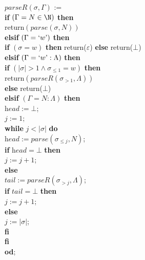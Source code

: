 \documentclass[adraft]{eptcs}
\begin{document}
\noindent
\begin{minipage}{3in}
$\textit{parseR}(\sigma,\Gamma)$ :=\\ \mbox{}
\quad \textbf{if} $(\Gamma=N\in\N)$ \textbf{then} \\ \mbox{}
\quad \quad return$(\textit{parse}(\sigma,N))$ \\ \mbox{}
\quad \textbf{elsif} $(\Gamma=`w\mbox{'})$ \textbf{then} \\ \mbox{}
\quad \quad \textbf{if} $(\sigma = w)$ \textbf{then} return($\varepsilon$) \textbf{else} return($\bot$) \\ \mbox{}
\quad \textbf{elsif} $(\Gamma= `w\mbox{'} : \Lambda)$ \textbf{then} \\ \mbox{}
\quad \quad \textbf{if} $(|\sigma| > 1 \wedge \sigma_{\leq 1} = w)$ \textbf{then} \\ \mbox{}
\quad \quad \quad return$(\textit{parseR}(\sigma_{> 1},\Lambda))$ \\ \mbox{}
\quad \quad \textbf{else} return($\bot$) \\ \mbox{}
\quad \textbf{elsif} $(\Gamma= N : \Lambda)$ \textbf{then} \\ \mbox{}
\quad \quad  $\textit{head} := \bot$; \\ \mbox{}
\quad \quad  $j:=1$; \\ \mbox{}
\quad \quad  \textbf{while} $j < |\sigma|$ \textbf{do} \\ \mbox{}
\quad \quad \quad $\textit{head} := \textit{parse}(\sigma_{\leq j},N)$; \\ \mbox{}
\quad \quad \quad  \textbf{if} $\textit{head}=\bot$ \textbf{then} \\ \mbox{}
\quad \quad \quad \quad $j:=j+1$; \\ \mbox{}
\quad \quad \quad  \textbf{else}  \\ \mbox{}
\quad \quad \quad \quad $\textit{tail} := \textit{parseR}(\sigma_{> j},\Lambda)$; \\ \mbox{}
\quad \quad \quad \quad  \textbf{if} $\textit{tail}=\bot$ \textbf{then} \\ \mbox{}
\quad \quad \quad \quad \quad $j:=j+1$; \\ \mbox{}
\quad \quad \quad \quad  \textbf{else}  \\ \mbox{}
\quad \quad \quad \quad \quad $j:=|\sigma|$; \\ \mbox{}
\quad \quad \quad \quad \textbf{fi} \\ \mbox{}
\quad \quad \quad \textbf{fi} \\ \mbox{}
\quad \quad \textbf{od}; \\ \mbox{}

\end{minipage}
\end{document}
